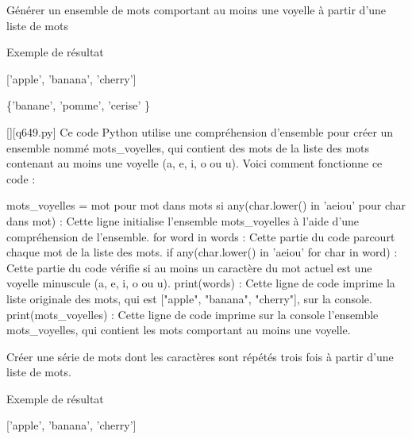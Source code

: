         \question
        Générer un ensemble de mots comportant au moins une voyelle à partir d'une liste de mots

Exemple de résultat

['apple', 'banana', 'cherry']

\{'banane', 'pomme', 'cerise' \}
        \par
        \begin{solution}
            \renewcommand{\nomfichier}{q649.py}
            \pythonfile{\chemincode \nomfichier}[][\nomfichier]
            Ce code Python utilise une compréhension d'ensemble pour créer un ensemble nommé mots_voyelles, qui contient des mots de la liste des mots contenant au moins une voyelle (a, e, i, o ou u). Voici comment fonctionne ce code :

    mots_voyelles = {mot pour mot dans mots si any(char.lower() in 'aeiou' pour char dans mot)} : Cette ligne initialise l'ensemble mots_voyelles à l'aide d'une compréhension de l'ensemble.
        for word in words : Cette partie du code parcourt chaque mot de la liste des mots.
        if any(char.lower() in 'aeiou' for char in word) : Cette partie du code vérifie si au moins un caractère du mot actuel est une voyelle minuscule (a, e, i, o ou u).
    print(words) : Cette ligne de code imprime la liste originale des mots, qui est ["apple", "banana", "cherry"], sur la console.
    print(mots_voyelles) : Cette ligne de code imprime sur la console l'ensemble mots_voyelles, qui contient les mots comportant au moins une voyelle.
        \end{solution}
        

        \question
        Créer une série de mots dont les caractères sont répétés trois fois à partir d'une liste de mots.

Exemple de résultat

['apple', 'banana', 'cherry']

